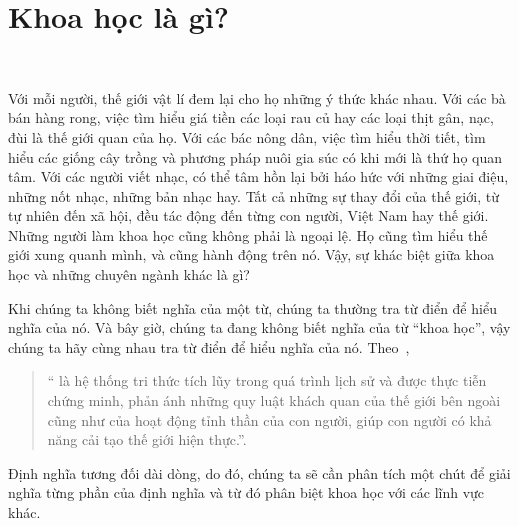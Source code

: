 \chapter{Khoa học là gì?}

\

Với mỗi người, thế giới vật lí đem lại cho họ những ý thức khác nhau. Với các bà bán hàng rong, việc tìm hiểu giá tiền các loại rau củ hay các loại thịt gân, nạc, đùi là thế giới quan của họ. Với các bác nông dân, việc tìm hiểu thời tiết, tìm hiểu các giống cây trồng và phương pháp nuôi gia súc có khi mới là thứ họ quan tâm. Với các người viết nhạc, có thể tâm hồn lại bởi háo hức với những giai điệu, những nốt nhạc, những bản nhạc hay. Tất cả những sự thay đổi của thế giới, từ tự nhiên đến xã hội, đều tác động đến từng con người, Việt Nam hay thế giới. Những người làm khoa học cũng không phải là ngoại lệ. Họ cũng tìm hiểu thế giới xung quanh mình, và cũng hành động trên nó. Vậy, sự khác biệt giữa khoa học và những chuyên ngành khác là gì?

Khi chúng ta không biết nghĩa của một từ, chúng ta thường tra từ điển để hiểu nghĩa của nó. Và bây giờ, chúng ta đang không biết nghĩa của từ ``khoa học'', vậy chúng ta hãy cùng nhau tra từ điển để hiểu nghĩa của nó. Theo~\cite{hoangphe2022tudientienviet},
\begin{quotation}
    `` là hệ thống tri thức tích lũy trong quá trình lịch sử và được thực tiễn chứng minh, phản ánh những quy luật khách quan của thế giới bên ngoài cũng như của hoạt động tỉnh thần của con người, giúp con người có khả năng cải tạo thế giới hiện thực.''.
\end{quotation}

Định nghĩa tương đối dài dòng, do đó, chúng ta sẽ cần phân tích một chút để giải nghĩa từng phần của định nghĩa và từ đó phân biệt khoa học với các lĩnh vực khác.









